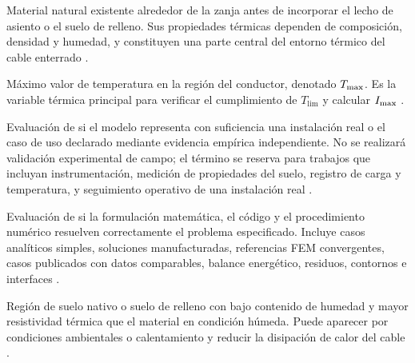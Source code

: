 \begin{description}[style=nextline,itemsep=0.5\baselineskip,parsep=0pt,topsep=0.25\baselineskip]
  \item[Suelo nativo.] Material natural existente alrededor de la zanja antes de incorporar el lecho de asiento o el suelo de relleno. Sus propiedades térmicas dependen de composición, densidad y humedad, y constituyen una parte central del entorno térmico del cable enterrado \parencites{farouki1981thermal,devries1966thermal}[1,6--9]{khumalo2025}[secciones 4--6]{ieee442}.

  \item[Temperatura máxima del conductor.] Máximo valor de temperatura en la región del conductor, denotado $T_{\max}$. Es la variable térmica principal para verificar el cumplimiento de $T_{\mathrm{lim}}$ y calcular $I_{\max}$ \parencites[752--760]{neher1957}{anders2005}[cláusulas 4--5]{iec60287}[3--6]{enescu2021}.

  \item[Validación.] Evaluación de si el modelo representa con suficiencia una instalación real o el caso de uso declarado mediante evidencia empírica independiente. No se realizará validación experimental de campo; el término se reserva para trabajos que incluyan instrumentación, medición de propiedades del suelo, registro de carga y temperatura, y seguimiento operativo de una instalación real \parencites{cigre2022}[93--99]{cigre2025}[350--351]{gregor2013}.

  \item[Verificación.] Evaluación de si la formulación matemática, el código y el procedimiento numérico resuelven correctamente el problema especificado. Incluye casos analíticos simples, soluciones manufacturadas, referencias FEM convergentes, casos publicados con datos comparables, balance energético, residuos, contornos e interfaces \parencites{cigre2022}[3--4,93--99]{cigre2025}[350--351]{gregor2013}.

  \item[Zona seca.] Región de suelo nativo o suelo de relleno con bajo contenido de humedad y mayor resistividad térmica que el material en condición húmeda. Puede aparecer por condiciones ambientales o calentamiento y reducir la disipación de calor del cable \parencites[4--6]{enescu2021}[1,6--9]{khumalo2025}[14851--14852]{fariz2026}.
\end{description}
\endgroup

